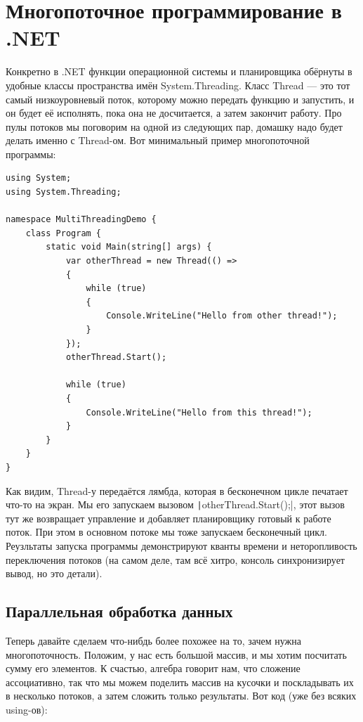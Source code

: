\documentclass[a5paper]{article}
\begin{document}
\section{Многопоточное программирование в .NET}

Конкретно в .NET функции операционной системы и планировщика обёрнуты в удобные классы пространства имён System.Threading. Класс Thread --- это тот самый низкоуровневый поток, которому можно передать функцию и запустить, и он будет её исполнять, пока она не досчитается, а затем закончит работу. Про пулы потоков мы поговорим на одной из следующих пар, домашку надо будет делать именно с Thread-ом. Вот минимальный пример многопоточной программы:

\begin{verbatim}
using System;
using System.Threading;

namespace MultiThreadingDemo {
    class Program {
        static void Main(string[] args) {
            var otherThread = new Thread(() => 
            {
                while (true)
                {
                    Console.WriteLine("Hello from other thread!");
                }
            });
            otherThread.Start();

            while (true)
            {
                Console.WriteLine("Hello from this thread!");
            }
        }
    }
}
\end{verbatim}

Как видим, Thread-у передаётся лямбда, которая в бесконечном цикле печатает что-то на экран. Мы его запускаем вызовом \texttt|otherThread.Start();|, этот вызов тут же возвращает управление и добавляет планировщику готовый к работе поток. При этом в основном потоке мы тоже запускаем бесконечный цикл. Реузльтаты запуска программы демонстрируют кванты времени и неторопливость переключения потоков (на самом деле, там всё хитро, консоль синхронизирует вывод, но это детали).

\subsection{Параллельная обработка данных}

Теперь давайте сделаем что-нибдь более похожее на то, зачем нужна многопоточность. Положим, у нас есть большой массив, и мы хотим посчитать сумму его элементов. К счастью, алгебра говорит нам, что сложение ассоциативно, так что мы можем поделить массив на кусочки и поскладывать их в несколько потоков, а затем сложить только результаты. Вот код (уже без всяких using-ов):
\end{document}

